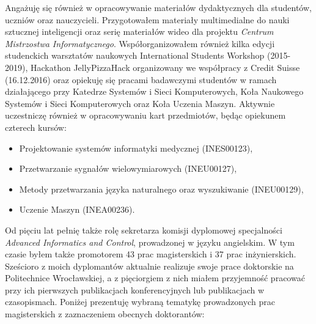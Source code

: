 Angażuję się również w opracowywanie materiałów dydaktycznych dla studentów, uczniów oraz nauczycieli. Przygotowałem materiały multimedialne do nauki sztucznej inteligencji oraz serię materiałów wideo dla projektu \emph{Centrum Mistrzostwa Informatycznego}. Współorganizowałem również kilka edycji studenckich warsztatów naukowych International Students Workshop (2015-2019), Hackathon JellyPizzaHack organizowany we współpracy z Credit Suisse (16.12.2016) oraz opiekuję się pracami badawczymi studentów w ramach działającego przy Katedrze Systemów i Sieci Komputerowych, Koła Naukowego Systemów i Sieci Komputerowych oraz Koła Uczenia Maszyn. Aktywnie uczestniczę również w opracowywaniu kart przedmiotów, będąc opiekunem  czterech kursów:

\begin{itemize}
	\item Projektowanie systemów informatyki medycznej (INES00123),
	\item Przetwarzanie sygnałów wielowymiarowych (INEU00127),
	\item Metody przetwarzania języka naturalnego oraz wyszukiwanie (INEU00129),
	\item Uczenie Maszyn (INEA00236).
\end{itemize}

Od pięciu lat pełnię także rolę sekretarza komisji dyplomowej specjalności \emph{Advanced Informatics and Control}, prowadzonej w języku angielskim. W tym czasie byłem także promotorem 43 prac magisterskich i 37 prac inżynierskich. Sześcioro z moich dyplomantów aktualnie realizuje swoje prace doktorskie na Politechnice Wrocławskiej, a z pięciorgiem z nich miałem przyjemność pracować przy ich pierwszych publikacjach konferencyjnych lub publikacjach w czasopismach. Poniżej prezentuję wybraną tematykę prowadzonych prac magisterskich z zaznaczeniem obecnych doktorantów:

